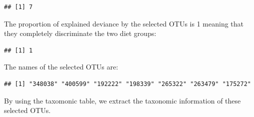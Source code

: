 \documentclass[openany]{book}
\newenvironment{Shaded}{\begin{snugshade}}{\end{snugshade}}
\newcommand{\KeywordTok}[1]{\textcolor[rgb]{0.13,0.29,0.53}{\textbf{#1}}}
\newcommand{\DataTypeTok}[1]{\textcolor[rgb]{0.13,0.29,0.53}{#1}}
\newcommand{\DecValTok}[1]{\textcolor[rgb]{0.00,0.00,0.81}{#1}}
\newcommand{\StringTok}[1]{\textcolor[rgb]{0.31,0.60,0.02}{#1}}
\newcommand{\OperatorTok}[1]{\textcolor[rgb]{0.81,0.36,0.00}{\textbf{#1}}}
\newcommand{\NormalTok}[1]{#1}
\begin{document}
\begin{Shaded}
\end{Shaded}

\begin{verbatim}
## [1] 7
\end{verbatim}

The proportion of explained deviance by the selected OTUs is 1 meaning
that they completely discriminate the two diet groups:

\begin{Shaded}
\end{Shaded}

\begin{verbatim}
## [1] 1
\end{verbatim}

The names of the selected OTUs are:

\begin{Shaded}
\end{Shaded}

\begin{verbatim}
## [1] "348038" "400599" "192222" "198339" "265322" "263479" "175272"
\end{verbatim}

By using the taxomonic table, we extract the taxonomic information of
these selected OTUs.

\begin{Shaded}
\end{Shaded}
\end{document}
